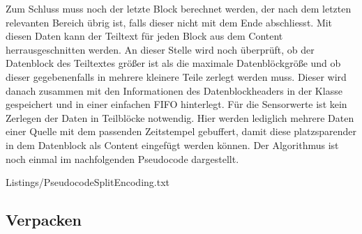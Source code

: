 Zum Schluss muss noch der letzte Block berechnet werden, der nach dem letzten
relevanten Bereich {\"u}brig ist, falls dieser nicht mit dem Ende abschliesst. Mit
diesen Daten kann der Teiltext f{\"u}r jeden Block aus dem Content
herrausgeschnitten werden. An dieser Stelle wird noch {\"u}berpr{\"u}ft, ob der
Datenblock des Teiltextes gr{\"o}{\ss}er ist als die maximale
Datenbl{\"o}ckgr{\"o}{\ss}e und ob dieser gegebenenfalls in mehrere kleinere
Teile zerlegt werden muss. Dieser wird danach zusammen mit den Informationen des Datenblockheaders in der Klasse 
gespeichert und in einer einfachen \gls{FIFO} hinterlegt. F{\"u}r die Sensorwerte
ist kein Zerlegen der Daten in Teilbl{\"o}cke notwendig.
Hier werden lediglich mehrere Daten einer Quelle mit dem passenden
Zeitstempel gebuffert, damit diese platzsparender in dem Datenblock als
Content eingef{\"u}gt werden k{\"o}nnen. \newline
Der Algorithmus ist noch einmal im nachfolgenden Pseudocode dargestellt.

\lstset{language=pseudo}
\lstset{commentstyle=\textit}
 {Listings/PseudocodeSplitEncoding.txt}

\subsection{Verpacken}

